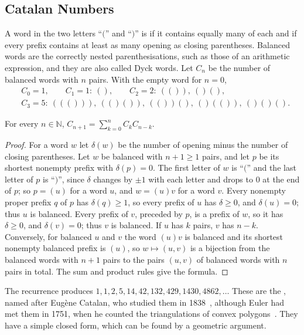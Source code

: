 \subsection{Catalan Numbers}

A word in the two letters ``$($'' and ``$)$'' is  if it contains equally many of each and if every prefix contains at least as many opening as closing parentheses. Balanced words are the correctly nested parenthesisations, such as those of an arithmetic expression, and they are also called Dyck words. Let $C_n$ be the number of balanced words with $n$ pairs. With the empty word for $n=0$,
\begin{align*}
&C_0=1,\qquad C_1=1:\ (),\qquad C_2=2:\ (()),\ ()(),\\
&C_3=5:\ ((())),\ (()()),\ (())(),\ ()(()),\ ()()() .
\end{align*}

\begin{proposition}
\label{prop:catalan-recurrence}
For every $n\in\mathbb N$, $C_{n+1}=\sum_{k=0}^{n}C_kC_{n-k}$.
\end{proposition}

\begin{proof}
For a word $w$ let $\delta(w)$ be the number of opening minus the number of closing parentheses. Let $w$ be balanced with $n+1\ge1$ pairs, and let $p$ be its shortest nonempty prefix with $\delta(p)=0$. The first letter of $w$ is ``$($'' and the last letter of $p$ is ``$)$'', since $\delta$ changes by $\pm1$ with each letter and drops to $0$ at the end of $p$; so $p=(u)$ for a word $u$, and $w=(u)v$ for a word $v$. Every nonempty proper prefix $q$ of $p$ has $\delta(q)\ge1$, so every prefix of $u$ has $\delta\ge0$, and $\delta(u)=0$; thus $u$ is balanced. Every prefix of $v$, preceded by $p$, is a prefix of $w$, so it has $\delta\ge0$, and $\delta(v)=0$; thus $v$ is balanced. If $u$ has $k$ pairs, $v$ has $n-k$. Conversely, for balanced $u$ and $v$ the word $(u)v$ is balanced and its shortest nonempty balanced prefix is $(u)$, so $w\mapsto(u,v)$ is a bijection from the balanced words with $n+1$ pairs to the pairs $(u,v)$ of balanced words with $n$ pairs in total. The sum and product rules give the formula.
\end{proof}

The recurrence produces $1,1,2,5,14,42,132,429,1430,4862,\ldots$ These are the , named after Eug\`ene Catalan, who studied them in 1838~\cite{catalan1838}, although Euler had met them in 1751, when he counted the triangulations of convex polygons~\cite{stanley2015catalan}. They have a simple closed form, which can be found by a geometric argument.

